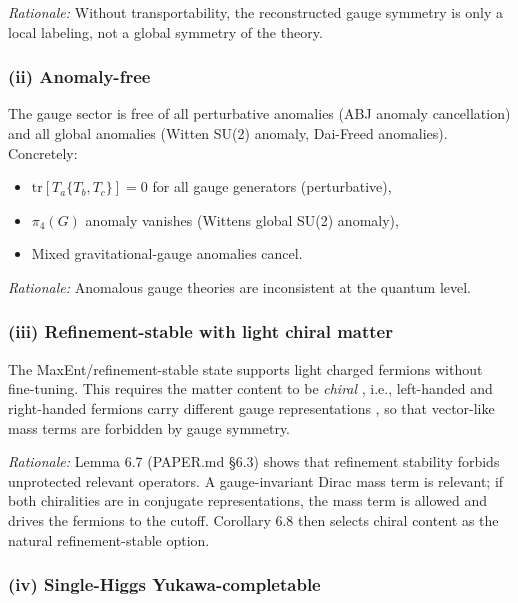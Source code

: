\emph{Rationale:} Without transportability, the reconstructed gauge symmetry is only a local labeling, not a global symmetry of the theory.

\subsubsection{(ii) Anomaly-free}\label{ii-anomaly-free}

The gauge sector is free of all perturbative anomalies (ABJ anomaly cancellation) and all global anomalies (Witten SU(2) anomaly, Dai-Freed anomalies). Concretely:

\begin{itemize}
\tightlist
\item
  \(\mathrm{tr}[T_a \{T_b, T_c\}] = 0\) for all gauge generators (perturbative),
\item
  \(\pi_4(G)\) anomaly vanishes (Witten\textquotesingle s global SU(2) anomaly),
\item
  Mixed gravitational-gauge anomalies cancel.
\end{itemize}

\emph{Rationale:} Anomalous gauge theories are inconsistent at the quantum level.

\subsubsection{(iii) Refinement-stable with light chiral matter}\label{iii-refinement-stable-with-light-chiral-matter}

The MaxEnt/refinement-stable state supports light charged fermions without fine-tuning. This requires the matter content to be \emph{chiral} , i.e., left-handed and right-handed fermions carry different gauge representations , so that vector-like mass terms are forbidden by gauge symmetry.

\emph{Rationale:} Lemma 6.7 (PAPER.md §6.3) shows that refinement stability forbids unprotected relevant operators. A gauge-invariant Dirac mass term is relevant; if both chiralities are in conjugate representations, the mass term is allowed and drives the fermions to the cutoff. Corollary 6.8 then selects chiral content as the natural refinement-stable option.

\subsubsection{(iv) Single-Higgs Yukawa-completable}\label{iv-single-higgs-yukawa-completable}

